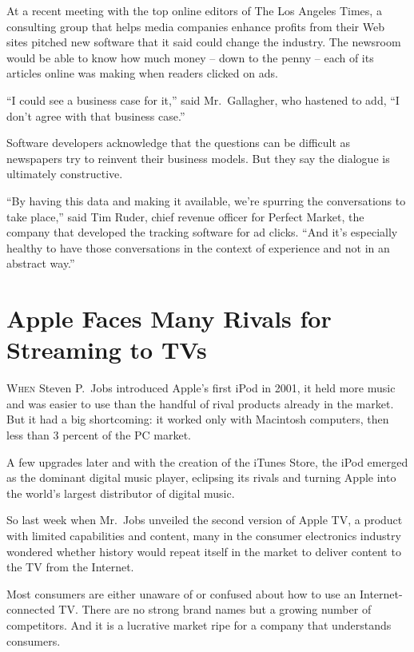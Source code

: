 ﻿\documentclass[12pt]{article}
\begin{document}
At a recent meeting with the top online editors of The Los Angeles Times, a consulting group that
helps media companies enhance profits from their Web sites pitched new software that it said could
change the industry. The newsroom would be able to know how much money -- down to the penny -- each
of its articles online was making when readers clicked on ads.

``I could see a business case for it,'' said Mr.~Gallagher, who hastened to add, ``I don't agree
with that business case.''

Software developers acknowledge that the questions can be difficult as newspapers try to reinvent
their business models. But they say the dialogue is ultimately constructive.

``By having this data and making it available, we're spurring the conversations to take place,''
said Tim Ruder, chief revenue officer for Perfect Market, the company that developed the tracking
software for ad clicks. ``And it's especially healthy to have those conversations in the context of
experience and not in an abstract way.''

\pagebreak
\section{Apple Faces Many Rivals for Streaming to TVs}

\lettrine{W}{hen} Steven P.~Jobs introduced Apple's first iPod in 2001, it
held more music and was easier to use than the handful of rival products already in the market. But
it had a big shortcoming: it worked only with Macintosh computers, then less than 3 percent of the
PC market.

A few upgrades later and with the creation of the iTunes Store, the iPod emerged as the dominant
digital music player, eclipsing its rivals and turning Apple into the world's largest distributor of
digital music.

So last week when Mr.~Jobs unveiled the second version of Apple TV, a product with limited
capabilities and content, many in the consumer electronics industry wondered whether history would
repeat itself in the market to deliver content to the TV from the Internet.

Most consumers are either unaware of or confused about how to use an Internet-connected TV. There
are no strong brand names but a growing number of competitors. And it is a lucrative market ripe for
a company that understands consumers.
\end{document}
